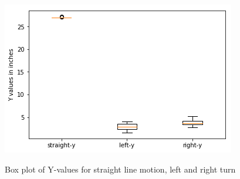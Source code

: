 \documentclass[11pt,a4paper]{article}
\begin{document}
\begin{figure}[H]
\centering	
\includegraphics[width=1.0\linewidth]{boxplot-y}
\label{fig:box-y}
\caption{Box plot of Y-values for straight line motion, left and right turn}
\end{figure}
\end{document}
